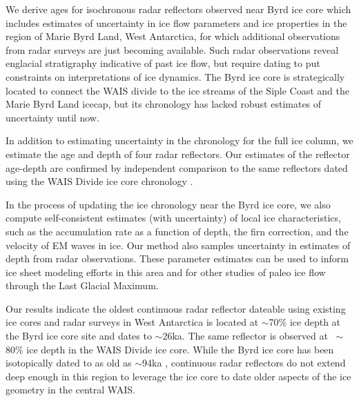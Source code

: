 

We derive ages for isochronous radar reflectors observed near Byrd ice core which includes estimates of uncertainty in ice flow parameters and ice properties in the region of Marie Byrd Land, West Antarctica, for which additional observations from radar surveys are just becoming available. Such radar observations reveal englacial stratigraphy indicative of past ice flow, but require dating to put constraints on interpretations of ice dynamics. The Byrd ice core is strategically located to connect the WAIS divide to the ice streams of the Siple Coast and the Marie Byrd Land icecap, but its chronology has lacked robust estimates of uncertainty until now. 

In addition to estimating uncertainty in the chronology for the full ice column, we estimate the age and depth of four radar reflectors. Our estimates of the reflector age-depth are confirmed by independent comparison to the same reflectors dated using the WAIS Divide ice core chronology \citep{buizert2015}. 

In the process of updating the ice chronology near the Byrd ice core, we also compute self-consistent estimates (with uncertainty) of local ice characteristics, such as the accumulation rate as a function of depth, the firn correction, and the velocity of EM waves in ice. Our method also samples uncertainty in estimates of depth from radar observations. These parameter estimates can be used to inform ice sheet modeling efforts in this area and for other studies of paleo ice flow through the Last Glacial Maximum. 

Our results indicate the oldest continuous radar reflector dateable using existing ice cores and radar surveys in West Antarctica is located at $\sim$70\% ice depth at the Byrd ice core site and dates to $\sim$26ka. The same reflector is observed at $~\sim$80\% ice depth in the WAIS Divide ice core. While the Byrd ice core has been isotopically dated to as old as $\sim$94ka \citep{blunier2001}, continuous radar reflectors do not extend deep enough in this region to leverage the ice core to date older aspects of the ice geometry in the central WAIS.




